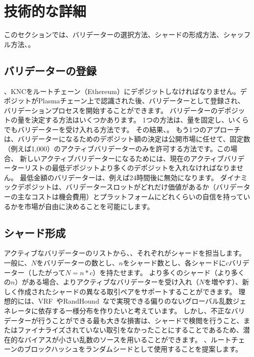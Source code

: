 \section{技術的な詳細}
\label{sec:details}

このセクションでは、バリデーターの選択方法、シャードの形成方法、シャッフル方法、。

\subsection{バリデーターの登録}
、KNCをルートチェーン（Ethereum）にデポジットしなければなりません。デポジットがPlasmaチェーン上で認識された後、バリデーターとして登録され、バリデーションプロセスを開始することができます。 バリデーターのデポジットの量を決定する方法はいくつかあります。 1つの方法は、量を固定し、いくらでもバリデーターを受け入れる方法です。 その結果、。 もう1つのアプローチは、バリデーターになるためのデポジット額の決定は公開市場に任せて、固定数（例えば1,000）のアクティブバリデーターのみを許可する方法です。この場合、 新しいアクティブバリデーターになるためには、現在のアクティブバリデーターリストの最低デポジットより多くのデポジットを入れなければなりません。 最低金額のバリデーターは、例えば24時間後に無効になります。 ダイナミックデポジットは、バリデータースロットがどれだけ価値があるか（バリデーターの主なコストは機会費用）とプラットフォームにどれくらいの自信を持っているかを市場が自由に決めることを可能にします。

\subsection{シャード形成}
アクティブなバリデーターのリストから、、それぞれがシャードを担当します。 一般に、$N$をバリデーターの数とし、$n$をシャード数とし、各シャードに$c$バリデーター（したがって$N = n*c$）を持たせます。 より多くのシャード（より多くの$n$）がある場合、よりアクティブなバリデーターを受け入れ（$N$を増やす）、新しく作成されたシャードの異なる取引ペアをサポートすることができます。 理想的には、VRF~\cite{algorand}やRandHound~\cite{randhound}なで実現できる偏りのないグローバル乱数ジェネレータに依存する一様分布を作りたいと考えています。 しかし、不正なバリデーターが行うことができる最も大きな損害は、シャードで検閲を行うこと、またはファイナライズされていない取引をなかったことにすることであるため、潜在的なバイアスが小さい乱数のソースを用いることができます。 、ルートチェーンのブロックハッシュをランダムシードとして使用することを提案します。

